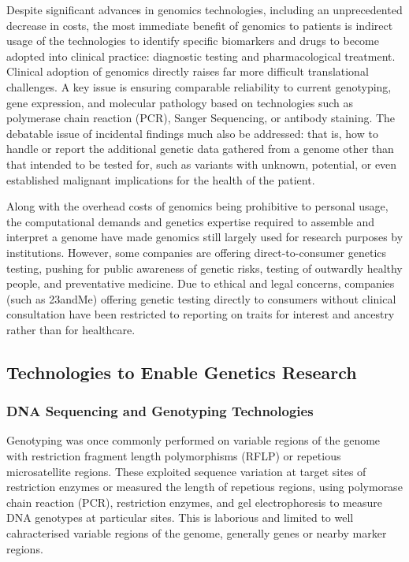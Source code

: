 Despite significant advances in genomics technologies, including an unprecedented decrease in costs, the most immediate benefit of genomics to patients is indirect usage of the technologies to identify specific biomarkers and drugs to become adopted into clinical practice: diagnostic testing and pharmacological treatment. Clinical adoption of genomics directly raises far more difficult translational challenges. A key issue is ensuring comparable reliability to current genotyping, gene expression, and molecular pathology based on technologies such as polymerase chain reaction (PCR), Sanger Sequencing, or antibody staining. The debatable issue of incidental findings much also be addressed: that is, how to handle or report the additional genetic data gathered from a genome other than that intended to be tested for, such as variants with unknown, potential, or even established malignant implications for the health of the patient.

Along with the overhead costs of genomics being prohibitive to personal usage, the computational demands and genetics expertise required to assemble and interpret a genome have made genomics still largely used for research purposes by institutions. However, some companies are offering direct-to-consumer genetics testing, pushing for public awareness of genetic risks, testing of outwardly healthy people, and preventative medicine. Due to ethical and legal concerns, companies (such as 23andMe) offering genetic testing directly to consumers without clinical consultation have been restricted to reporting on traits for interest and ancestry rather than for healthcare.

\subsection{Technologies to Enable Genetics Research}
\subsubsection{DNA Sequencing and Genotyping Technologies}
Genotyping was once commonly performed on variable regions of the genome with restriction fragment length polymorphisms (RFLP) or repetious microsatellite regions. These exploited sequence variation at target sites of restriction enzymes or measured the length of repetious regions, using polymorase chain reaction (PCR), restriction enzymes, and gel electrophoresis to measure DNA genotypes at particular sites. This is laborious and limited to well cahracterised variable regions of the genome, generally genes or nearby marker regions. 

